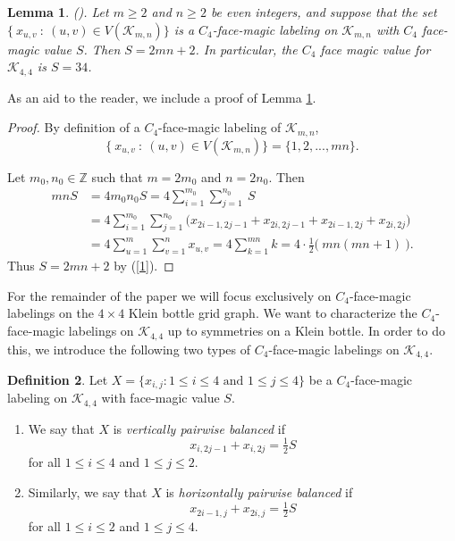 \documentclass[10pt, reqno]{amsart}
\theoremstyle{definition}
\newtheorem{definition}{Definition}
\theoremstyle{plain}
\newtheorem{lemma}[definition]{Lemma}
\begin{document}
\begin{lemma}\label{lem1}\rm(\cite[Lemma 7]{CurranLowLocke2})\it. 
    Let $m\ge 2$ and $n\ge 2$ be even integers, and suppose that the set $\{\ x_{u,v}\ : \ (u,v)\in V(\mathcal{K}_{m,n}) \}$ is a $C_4$-face-magic labeling on $\mathcal{K}_{m,n}$ with $C_4$ face-magic value $S$. Then $S=2mn+2$. In particular, the $C_4$ face magic value for $\mathcal{K}_{4,4}$ is $S=34$.
\end{lemma}

As an aid to the reader, we include a proof of Lemma \ref{lem1}. 

\begin{proof}
  By definition of a $C_4$-face-magic labeling of $\mathcal{K}_{m,n}$, 
\begin{equation*}
\{\ x_{u,v}\ : \ (u,v)\in V(\mathcal{K}_{m,n}) \}=\{1,2,...,mn\}.
\end{equation*}

  Let $m_0, n_0\in\mathbb{Z}$  such that $m=2m_0$ and $n=2n_0$. Then
\begin{equation}\label{1}
\begin{aligned}
 mnS&=4m_0n_0S=4\sum_{i=1}^{m_0}\sum_{j=1}^{n_0}\ S\\
    &=4\sum_{i=1}^{m_0}\sum_{j=1}^{n_0}\big( x_{2i-1, 2j-1}+x_{2i, 2j-1}+x_{2i-1, 2j}+x_{2i, 2j}  \big)\\
    &=4\sum_{u=1}^m\sum_{v=1}^nx_{u,v}=4\sum_{k=1}^{mn}k=4\cdot\tfrac{1}{2}\big(\ mn(mn+1)\ \big).
\end{aligned}
\end{equation}
 Thus $S=2mn+2$ by (\ref{1}).
\end{proof}

For the remainder of the paper we will focus 
exclusively on $C_4$-face-magic labelings on the
$4\times 4$ Klein bottle grid graph.
We want to characterize the $C_4$-face-magic labelings on
$\mathcal{K}_{4,4}$ up to symmetries on a Klein bottle.
In order to do this, we introduce the following two types of
$C_4$-face-magic labelings on $\mathcal{K}_{4,4}$.

\begin{definition}
Let  $X=\{x_{i,j}: 1\le i \le 4 \text{ and } 
   1\le j \le 4\}$ be a $C_4$-face-magic labeling 
   on  $\mathcal{K}_{4,4}$ with face-magic value $S$.
   \begin{enumerate}
       \item We say that $X$ is 
       \textit{vertically pairwise balanced} if
   \begin{equation*}
       x_{i,2j-1} + x_{i,2j} =\tfrac{1}{2} S
   \end{equation*}
   for all $1\le i \le 4$ and $1\le j \le 2$.
  \item Similarly, we say that $X$ is
   \textit{horizontally pairwise balanced} if
   \begin{equation*}
       x_{2i-1,j} + x_{2i,j} =\tfrac{1}{2} S
   \end{equation*}
   for all $1\le i \le 2$ and $1\le j \le 4$.
    \end{enumerate}
\end{definition}
\end{document}

